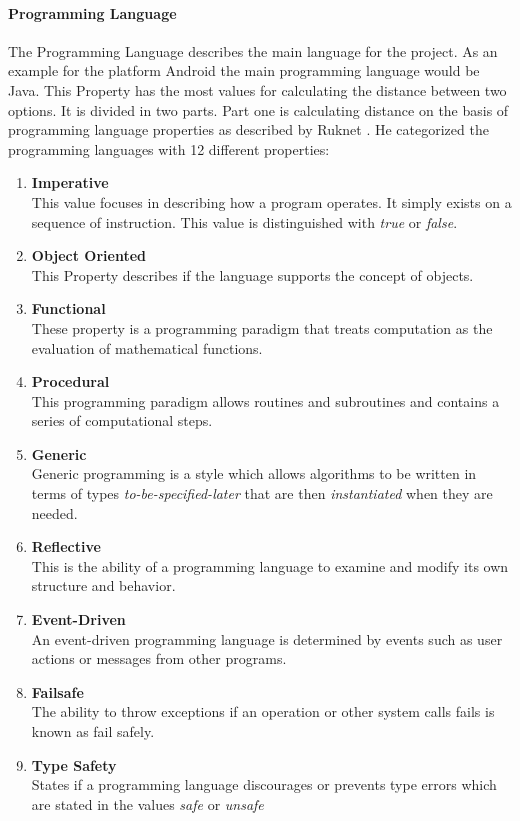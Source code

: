 \paragraph*{\textbf{Programming Language}}
The Programming Language describes the main language for the project. As an example for the platform Android the main programming language would be Java. This Property has the most values for calculating the distance between two options. It is divided in two parts. Part one is calculating distance on the basis of programming language properties as described by Ruknet \cite{ruknet}. He categorized the programming languages with 12 different properties:
\begin{enumerate}
	\item \textbf{Imperative}\\ This value focuses in describing how a program operates. It simply exists on a sequence of instruction. This value is distinguished with \textit{true} or \textit{false}.
	\item \textbf{Object Oriented}\\ This Property describes if the language supports the concept of objects.
	\item \textbf{Functional}\\ These property is a programming paradigm that treats computation as the evaluation of mathematical functions. 
	\item \textbf{Procedural}\\ This programming paradigm allows routines and subroutines and contains a series of computational steps.
	\item \textbf{Generic}\\ Generic programming is a style which allows algorithms to be written in terms of types \textit{to-be-specified-later} that are then \textit{instantiated} when they are needed.
	\item \textbf{Reflective}\\ This is the ability of a programming language to examine and modify its own structure and behavior.
	\item \textbf{Event-Driven}\\ An event-driven programming language is determined by events such as user actions or messages from other programs.
	\item \textbf{Failsafe}\\ The ability to throw exceptions if an operation or other system calls fails is known as fail safely.
	\item \textbf{Type Safety}\\States if a programming language discourages or prevents type errors which are stated in the values \textit{safe} or \textit{unsafe}

\end{enumerate}
